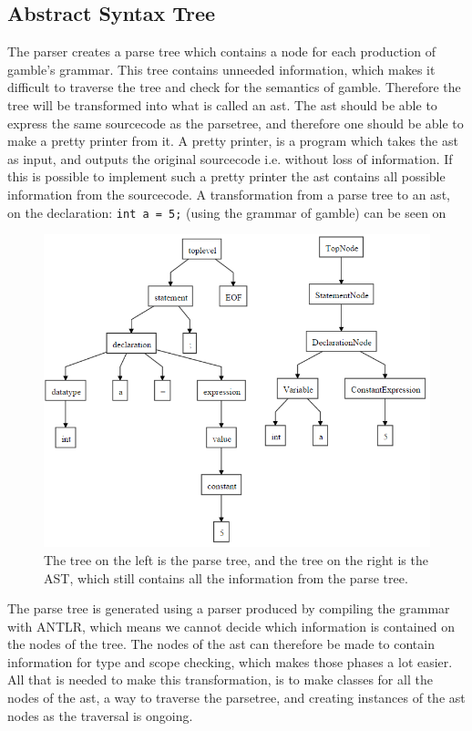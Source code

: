 \subsection*{Abstract Syntax Tree}\label{sec:AST}
The parser creates a parse tree which contains a node for each production of \gls{gamble}'s grammar.
This tree contains unneeded information, which makes it difficult to traverse the tree and check for the semantics of \gls{gamble}.
Therefore the tree will be transformed into what is called an \acrfull{ast}.
The \acrshort{ast} should be able to express the same sourcecode as the parsetree, and therefore one should be able to make a pretty printer from it.
A pretty printer, is a program which takes the \acrshort{ast} as input, and outputs the original sourcecode i.e. without loss of information.
If this is possible to implement such a pretty printer the \acrshort{ast} contains all possible information from the sourcecode.
A transformation from a parse tree to an \acrshort{ast}, on the declaration: \texttt{int a = 5;} (using the grammar of \gls{gamble}) can be seen on 

\begin{figure}
		\centering
	 	\includegraphics[width=0.8\linewidth]{figures/Trees/AST.PNG}
		\caption{The tree on the left is the parse tree, and the tree on the right is the AST, which still contains all the information from the parse tree.} \label{image:AST}
\end{figure}

The parse tree is generated using a parser produced by compiling the grammar with ANTLR, which means we cannot decide which information is contained on the nodes of the tree.
The nodes of the \acrshort{ast} can therefore be made to contain information for type and scope checking, which makes those phases a lot easier.
All that is needed to make this transformation, is to make classes for all the nodes of the \acrshort{ast}, a way to traverse the parsetree, and creating instances of the \acrshort{ast} nodes as the traversal is ongoing.



